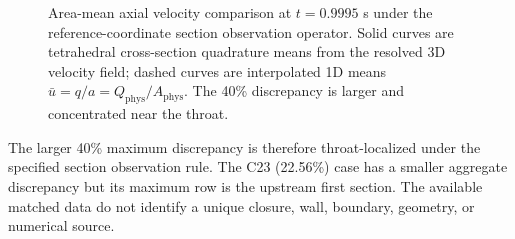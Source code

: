 \begin{table}[!htb]
    \centering
    \scriptsize
    \caption{Reference-coordinate section-mean velocity discrepancy summary at
    the matched final-time sample after applying the common section observation
    operator. Values are in cm/s except for the axial location column in cm; the
    40\% case has the larger relative RMS discrepancy, and the table reports
    discrepancy magnitude rather than causal attribution.}
    \label{tab:t1-3d-comparison-summary}
\end{table}

\begin{figure}[!htb]
    \centering
    \captionsetup{aboveskip=2pt,belowskip=2pt}
    \caption{Area-mean axial velocity comparison at $t=0.9995$ s under the
    reference-coordinate section observation operator. Solid curves are
    tetrahedral cross-section quadrature means from the resolved 3D velocity
    field; dashed curves are interpolated 1D means
    $\bar u=q/a=Q_{\mathrm{phys}}/A_{\mathrm{phys}}$. The 40\% discrepancy is
    larger and concentrated near the throat.}
    \label{fig:t1-section-mean-comparison}
\end{figure}

The larger 40\% maximum discrepancy is therefore throat-localized under the
specified section observation rule. The C23 (22.56\%) case has a smaller
aggregate discrepancy but its maximum row is the upstream first section. The
available matched data do not identify a unique closure, wall, boundary,
geometry, or numerical source.

